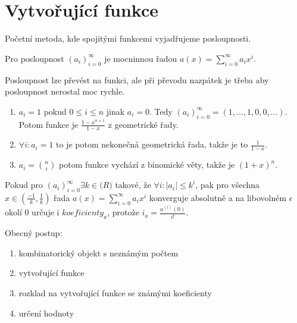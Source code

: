\chapter{Vytvořující funkce}

Početní metoda, kde spojitými funkcemi vyjadřujeme posloupnosti.

\begin{definice}
	Pro posloupnost $(a_{i})_{i=0}^{\infty}$ je mocninnou řadou $a(x) = \sum_{i=0}^{\infty}a_{i}x^{i}$.
\end{definice}

Posloupnost lze převést na funkci, ale při převodu nazpátek je třeba aby posloupnost nerostal moc rychle.

\begin{prikl}
	\begin{enumerate}
		\item $a_i = 1$ pokud $0 \leq i \leq n$ jinak $a_i = 0$. Tedy $(a_i)_{i=0}^{\infty}=(1,\dots,1,0,0,\dots)$. Potom funkce je $\frac{1-x^{n+1}}{1-x}$ z geometrické řady.
		\item $\forall i: a_i = 1$ to je potom nekonečná geometrická řada, takže je to $\frac{1}{1-x}$.
		\item $a_i = \binom{n}{i}$ potom funkce vychází z binomické věty, takže je $(1+x)^{n}$.
	\end{enumerate}
\end{prikl}

\begin{tvrz}
	Pokud pro $(a_i)_{i=0}^{\infty} \exists k \in \mathbb(R)$ takové, že $\forall i: |a_i| \leq k^i$, pak pro všechna $x \in (\frac{-1}{k}, \frac{1}{k})$ řada $a(x) = \sum_{i=0}^{\infty}a_ix^i$ konverguje absolutně a na libovolném $\epsilon$ okolí 0 určuje i $koeficienty_a$, protože $i_a = \frac{a^{(i)}(0)}{i!}$.
\end{tvrz}


Obecný postup:

\begin{enumerate}
	\item kombinatorický objekt s neznámým počtem
	\item vytvořující funkce
	\item rozklad na vytvořující funkce se známými koeficienty
	\item určení hodnoty
\end{enumerate}


